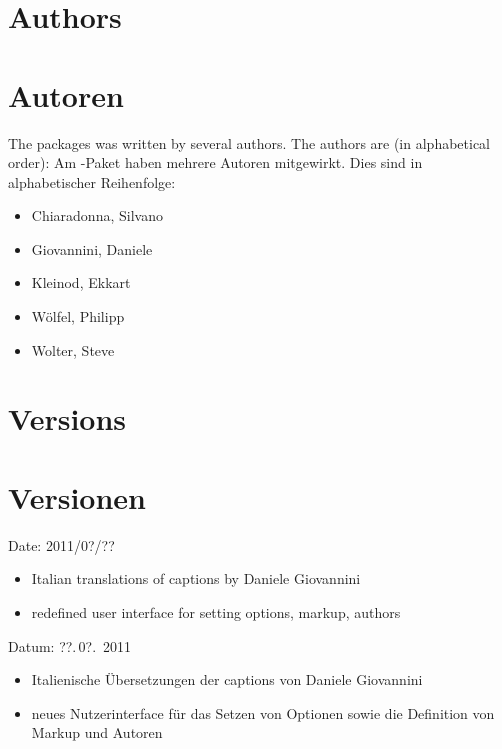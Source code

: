 \ifENGLISH
	\section{Authors}
\fi
	\ifGERMAN
		\section{Autoren}
	\fi
\label{sec:authors}

\ifENGLISH
	The  packages was written by several authors.
	The authors are (in alphabetical order):
\fi
	\ifGERMAN
		Am -Paket haben mehrere Autoren mitgewirkt.
		Dies sind in alphabetischer Reihenfolge:
	\fi
\begin{itemize}
	\item Chiaradonna, Silvano
	\item Giovannini, Daniele
	\item Kleinod, Ekkart
	\item Wölfel, Philipp
	\item Wolter, Steve
\end{itemize}



\ifENGLISH
	\section{Versions}
\fi
	\ifGERMAN
		\section{Versionen}
	\fi
\label{sec:versions}


\ifENGLISH
	Date: 2011/0?/??
	\begin{itemize}
		\item Italian translations of captions by Daniele Giovannini
		\item redefined user interface for setting options, markup, authors
	\end{itemize}
\fi
	\ifGERMAN
		Datum: ??.\,0?.~2011
		\begin{itemize}
			\item Italienische Übersetzungen der captions von Daniele Giovannini
			\item neues Nutzerinterface für das Setzen von Optionen sowie die Definition von Markup und Autoren
		\end{itemize}
	\fi

